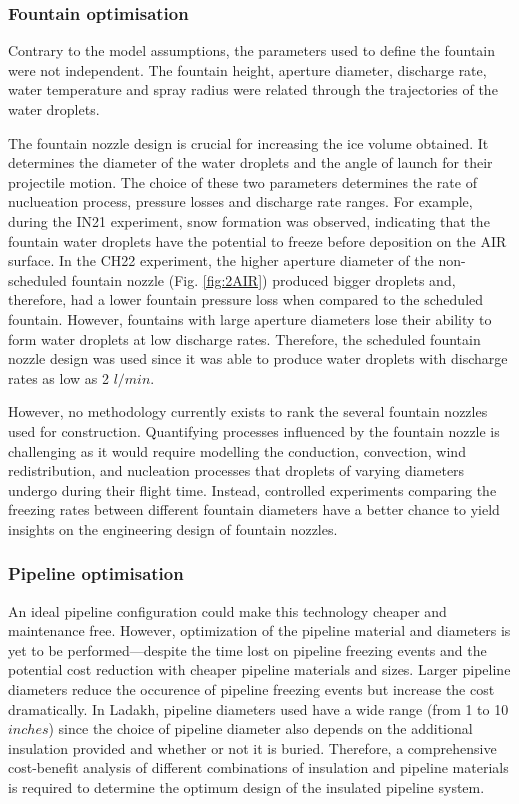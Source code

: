 \documentclass[tc, manuscript]{copernicus}
\begin{document}
\subsubsection{Fountain optimisation}

Contrary to the model assumptions, the parameters used to define the fountain were not independent. The fountain
height, aperture diameter, discharge rate, water temperature and spray radius were related through the
trajectories of the water droplets.

The fountain nozzle design is crucial for increasing the ice volume obtained. It determines the diameter of the
water droplets and the angle of launch for their projectile motion. The choice of these two parameters
determines the rate of nuclueation process, pressure losses and discharge rate ranges. For example, during the
IN21 experiment, snow formation was observed, indicating that the fountain water droplets have the potential to
freeze before deposition on the AIR surface. In the CH22 experiment, the higher aperture diameter of the
non-scheduled fountain nozzle (Fig. \ref{fig:2AIR}) produced bigger droplets and, therefore, had a lower fountain
pressure loss when compared to the scheduled fountain. However, fountains with large aperture diameters lose
their ability to form water droplets at low discharge rates. Therefore, the scheduled fountain nozzle design was
used since it was able to produce water droplets with discharge rates as low as 2 $l/min$.

However, no methodology currently exists to rank the several fountain nozzles used for construction. Quantifying
processes influenced by the fountain nozzle is challenging as it would require modelling the conduction,
convection, wind redistribution, and nucleation processes that droplets of varying diameters undergo during
their flight time. Instead, controlled experiments comparing the freezing rates between different fountain
diameters have a better chance to yield insights on the engineering design of fountain nozzles.

\subsubsection{Pipeline optimisation}

An ideal pipeline configuration could make this technology cheaper and maintenance free. However, optimization
of the pipeline material and diameters is yet to be performed---despite the time lost on pipeline freezing
events and the potential cost reduction with cheaper pipeline materials and sizes. Larger pipeline diameters
reduce the occurence of pipeline freezing events but increase the cost dramatically. In Ladakh, pipeline
diameters used have a wide range (from 1 to 10 $inches$) since the choice of pipeline diameter also depends on
the additional insulation provided and whether or not it is buried. Therefore, a comprehensive cost-benefit
analysis of different combinations of insulation and pipeline materials is required to determine the optimum
design of the insulated pipeline system.  
\end{document}
